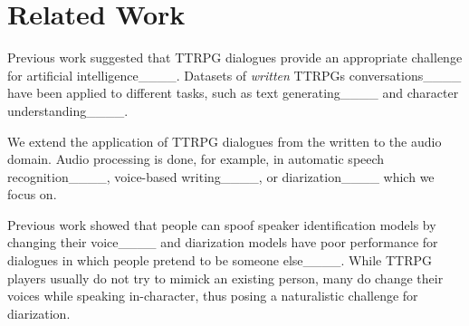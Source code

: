 \section{Related Work}
Previous work suggested that TTRPG dialogues provide an appropriate challenge for artificial intelligence____.
Datasets of \textit{written} TTRPGs conversations____ have been applied to different tasks, such as text generating____ and character understanding____.

We extend the application of TTRPG dialogues from the written to the audio domain. Audio processing is done, for example, in automatic speech recognition____, voice-based writing____, or diarization____ which we focus on.

Previous work showed that people can spoof speaker identification models by changing their voice____ and diarization models have poor performance for dialogues in which people pretend to be someone else____.
While TTRPG players usually do not try to mimick an existing person, many do change their voices while speaking in-character, thus posing a naturalistic challenge for diarization. %